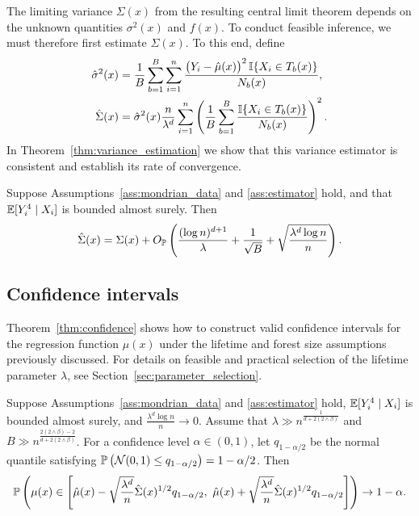 The limiting variance $\Sigma(x)$ from the resulting central limit theorem
depends on the unknown quantities $\sigma^2(x)$ and $f(x)$.
To conduct feasible inference, we must therefore first estimate
$\Sigma(x)$. To this end, define
%
\begin{align}
  \label{eq:sigma2_hat}
  \hat\sigma^2(x)
  &=
  \frac{1}{B}
  \sum_{b=1}^{B}
  \sum_{i=1}^n
  \frac{\big(Y_i - \hat \mu(x)\big)^2 \, \I\{X_i \in T_b(x)\}}
  {N_b(x)}, \\
  \nonumber
  \hat\Sigma(x)
  &=
  \hat\sigma^2(x)
  \frac{n}{\lambda^d}
  \sum_{i=1}^n
  \left(
    \frac{1}{B}
    \sum_{b=1}^B
    \frac{\I\{X_i \in T_b(x)\}}{N_b(x)}
  \right)^2.
\end{align}
%
In Theorem~\ref{thm:variance_estimation} we show that this variance
estimator is consistent and establish its rate of convergence.
%
\begin{theorem}%
  \label{thm:variance_estimation}
  Suppose Assumptions~\ref{ass:mondrian_data}
  and \ref{ass:estimator} hold, and that
  $\E[Y_i^4 \mid X_i ]$ is bounded almost surely.
  Then
  \begin{align*}
    \hat\Sigma(x)
    = \Sigma(x)
    + O_\P \left(
      \frac{(\log n)^{d+1}}{\lambda}
      + \frac{1}{\sqrt B}
      + \sqrt{\frac{\lambda^d \log n}{n}}
    \right).
  \end{align*}

\end{theorem}

\subsection{Confidence intervals}

Theorem~\ref{thm:confidence} shows how to construct valid confidence
intervals for the regression function $\mu(x)$ under the
lifetime and forest size assumptions previously discussed.
For details on feasible and practical selection of
the lifetime parameter $\lambda$,
see Section~\ref{sec:parameter_selection}.
%
\begin{theorem}%
  \label{thm:confidence}
  Suppose Assumptions~\ref{ass:mondrian_data} and \ref{ass:estimator} hold,
  $\E[Y_i^4 \mid X_i ]$ is bounded almost surely,
  and $\frac{\lambda^d \log n}{n} \to 0$.
  Assume that
  $\lambda \gg n^{\frac{1}{d + 2(2 \wedge \beta)}}$
  and $B \gg n^{\frac{2 (2 \wedge \beta) - 2}{d + 2 (2 \wedge \beta)}}$.
  For a confidence level $\alpha \in (0, 1)$,
  let $q_{1 - \alpha / 2}$ be the normal quantile satisfying
  $\P \left( \cN(0, 1) \leq q_{1 - \alpha / 2} \right) = 1 - \alpha / 2$.
  Then
  \begin{align*}
    \P \left(
      \mu(x) \in
      \left[
        \hat \mu(x)
        - \sqrt{\frac{\lambda^d}{n}} \hat \Sigma(x)^{1/2}
        q_{1 - \alpha / 2}, \
        \hat \mu(x)
        + \sqrt{\frac{\lambda^d}{n}} \hat \Sigma(x)^{1/2}
        q_{1 - \alpha / 2}
      \right]
    \right)
    \to
    1 - \alpha.
  \end{align*}

\end{theorem}

